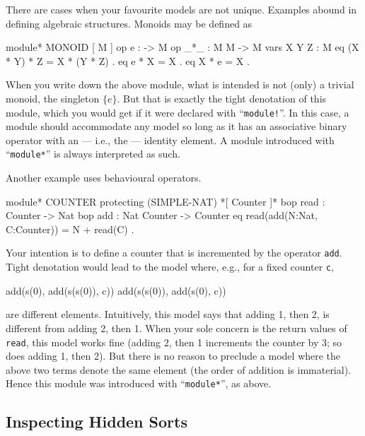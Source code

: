 \documentclass[a4paper]{memoir}
\begin{document}
There are cases when your favourite models are not unique. Examples
abound in defining algebraic structures. Monoids may be defined as
\label{exs:monoid}
\begin{vvtm}
\begin{ccode}
  module* MONOID {
    [ M ]
    op e : -> M
    op _*_ : M M -> M
    vars X Y Z : M
    eq (X * Y) * Z = X * (Y * Z) .
    eq e * X = X .
    eq X * e = X .
  }
\end{ccode}
\end{vvtm}
When you write down the above module, what is intended is not
(only) a trivial monoid, the singleton $\{ e \}$. But that is
exactly the tight denotation of this module, which you would get
if it were declared with ``\verb|module!|''. In this case, a module
should accommodate any model so long as it has an associative
binary operator with an --- i.e., the --- identity element.
A module introduced with ``\verb|module*|'' is always interpreted as such.

Another example uses behavioural operators.\label{exs:counter}
\begin{vvtm}
\begin{ccode}
  module* COUNTER {
    protecting (SIMPLE-NAT)
    *[ Counter ]*
    bop read : Counter -> Nat
    bop add : Nat Counter -> Counter
    eq read(add(N:Nat, C:Counter)) = N + read(C) .
  }
\end{ccode}
\end{vvtm}
Your intention is to define a counter that is incremented by
the operator \verb|add|. Tight denotation would lead to the model
where, e.g., for a fixed counter \verb|c|,
\begin{vvtm}
\begin{ccode}
  add(s(0), add(s(s(0)), c))
  add(s(s(0)), add(s(0), c))
\end{ccode}
\end{vvtm}
are different elements. Intuitively, this model says that
adding 1, then 2, is different from adding 2, then 1. When your
sole concern is the return values of \verb|read|, this model
works fine (adding 2, then 1 increments the counter by 3;
so does adding 1, then 2). But there is no reason to
preclude a model where the above two terms denote the same
element (the order of addition is immaterial). Hence this
module was introduced with ``\verb|module*|'', as above.

\subsection{Inspecting Hidden Sorts}\label{sec:p2-hsort-beget-axs}
\end{document}
